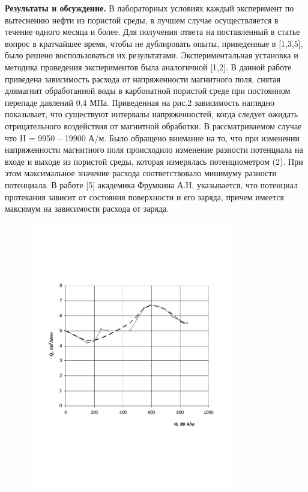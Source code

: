 {\bfseries Результаты и обсуждение.} В лабораторных условиях каждый
эксперимент по вытеснению нефти из пористой среды, в лучшем случае
осуществляется в течение одного месяца и более. Для получения ответа на
поставленный в статье вопрос в кратчайшее время, чтобы не дублировать
опыты, приведенные в {[}1,3,5{]}, было решено воспользоваться их
результатами. Экспериментальная установка и методика проведения
экспериментов была аналогичной {[}1,2{]}. В данной работе приведена
зависимость расхода от напряженности магнитного поля, снятая длямагнит
обработанной воды в карбонатной пористой среде при постоянном перепаде
давлений 0,4 МПа. Приведенная на рис.2 зависимость наглядно показывает,
что существуют интервалы напряженностей, когда следует ожидать
отрицательного воздействия от магнитной обработки. В рассматриваемом
случае что H = 9950 -- 19900 А/м. Было обращено внимание на то, что при
изменении напряженности магнитного поля происходило изменение разности
потенциала на входе и выходе из пористой среды, которая измерялась
потенциометром (2). При этом максимальное значение расхода
соответствовало минимуму разности потенциала. В работе {[}5{]} академика
Фрумкина А.Н. указывается, что потенциал протекания зависит от состояния
поверхности и его заряда, причем имеется максимум на зависимости расхода
от заряда.

\begin{figure}[H]
	\centering
	\includegraphics[width=0.8\textwidth]{media/gorn4/image3}
	\caption*{}
\end{figure}


